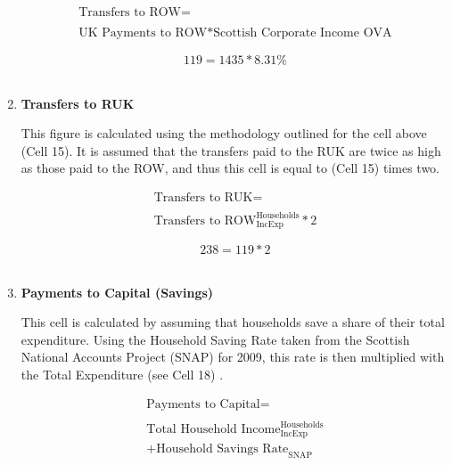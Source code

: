 \begin{enumerate}
\begin{equation}
\begin{split}
\text{Transfers to ROW} =  \\ \\
\text{UK Payments to ROW}*\text{Scottish Corporate Income OVA}
\end{split} \label{eq:2.5.19}
\end{equation}

\begin{equation} \nonumber
119 = 1435*8.31\%
\end{equation}\\


\item \textbf {Transfers to RUK}

This figure is calculated using the methodology outlined for the cell above (Cell 15). It is assumed that the transfers paid to the RUK are twice as high as those paid to the ROW, and thus this cell is equal to (Cell 15) times two.

\begin{equation}
\begin{split}
\text{Transfers to RUK} =  \\ \\
\text{Transfers to ROW}^\text{Households}_\text{IncExp}*2
\end{split} \label{eq:2.5.18}
\end{equation}

\begin{equation} \nonumber
238 = 119*2
\end{equation}\\


\item \textbf {Payments to Capital (Savings)}

This cell is calculated by assuming that households save a share of their total expenditure. Using the Household Saving Rate taken from the Scottish National Accounts Project (SNAP) for 2009\cite{ScotGov2013c}, this rate is then multiplied with the Total Expenditure (see Cell 18) .

\begin{equation}
\begin{split}
\text{Payments to Capital} =  \\ \\
\text{Total Household Income}^\text{Households}_\text{IncExp}\\
+\text{Household Savings Rate}_\text{SNAP}
\end{split} \label{eq:2.5.20}
\end{equation}


\end{enumerate}
